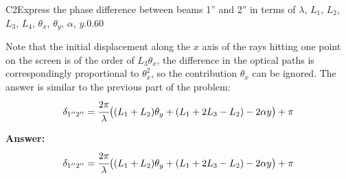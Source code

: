 \documentclass[11pt,a4paper]{article}
\begin{document}
\begin{solcard}{C2}{Express the phase difference between beams 1'' and 2'' in terms of $\lambda$, $L_1$, $L_2$, $L_3$, $L_4$, $\theta_x$, $\theta_y$, $\alpha$, $y$.}{0.60}

Note that the initial displacement along the $x$ axis of the rays hitting one point on the screen is of the order of $L_3 \theta_x$, the difference in the optical paths is correspondingly proportional to $\theta_x^2$, so the contribution $\theta_x$ can be ignored. The answer is similar to the previous part of the problem: \[\delta_{1''2''}=\cfrac{2\pi}{\lambda}\big((L_1+L_2)\theta_y+(L_1+2L_3-L_2)-2\alpha y\big)+\pi\]

\par\smallskip\noindent\textbf{Answer:} \[\delta_{1''2''}=\cfrac{2\pi}{\lambda}\big((L_1+L_2)\theta_y+(L_1+2L_3-L_2)-2\alpha y\big)+\pi\]
\end{solcard}
\end{document}
